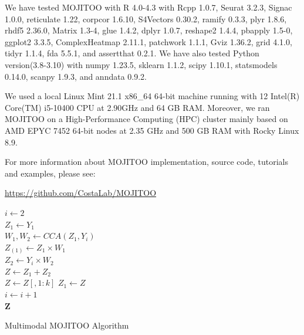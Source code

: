 We have tested MOJITOO with R 4.0-4.3 with Rcpp 1.0.7, Seurat 3.2.3,  Signac 1.0.0, reticulate 1.22, corpcor 1.6.10,  S4Vectors 0.30.2,  ramify 0.3.3,  plyr 1.8.6,  rhdf5 2.36.0,  Matrix 1.3-4,  glue 1.4.2,  dplyr 1.0.7,  reshape2 1.4.4,  pbapply 1.5-0,  ggplot2 3.3.5, ComplexHeatmap 2.11.1, patchwork 1.1.1, Gviz 1.36.2, grid 4.1.0, tidyr 1.1.4, fda 5.5.1, and assertthat 0.2.1. We have also tested Python version(3.8-3.10) with numpy 1.23.5, sklearn 1.1.2, scipy 1.10.1, statsmodels 0.14.0, scanpy 1.9.3, and anndata 0.9.2.

We used a local Linux Mint 21.1 x86\_64 64-bit machine running with 12 Intel(R) Core(TM) i5-10400 CPU at 2.90GHz and 64 GB RAM. Moreover, we ran MOJITOO on a High-Performance Computing (HPC) cluster mainly based on AMD EPYC 7452 64-bit nodes at 2.35 GHz and 500 GB RAM with  Rocky Linux 8.9. 

For more information about MOJITOO implementation, source code, tutorials and examples, please see:
\begin{center}
\url{https://github.com/CostaLab/MOJITOO}
\end{center}



\begin{algorithm}

	$i \gets 2$ \\
	$Z_{1} \gets Y_{1}$ \\
	{
		$W_{1}, W_{2} \gets CCA(Z_{1}, Y_{i})$ \\ 
		$Z_{(1)} \gets Z_{1}\times W_{1}$ \\ 
		$Z_{2} \gets Y_{i}\times W_{2}$  \\
		$Z \gets Z_{1} + Z_{2}$ \\ 
		$Z \gets Z[, 1:k]$ 
		$Z_{1} \gets Z$ \\
		$i \gets i+1$  \\
	}
	\Return $\mathbf{Z}$ 
	\caption{Multimodal MOJITOO Algorithm }
	\label{alg:MOJITOO}
\end{algorithm}

